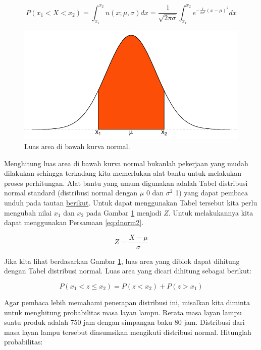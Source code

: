 \documentclass[]{book}
\begin{document}
\[
P\left(x_1<X<x_2\right)=\int_{x_1}^{x_2}n\left(x;\mu,\sigma\right)dx=\frac{1}{\sqrt{2\pi\sigma}}\int_{x_1}^{x_2}e^{-\frac{1}{2\sigma^2}\left(x-\mu\right)^2}dx
\]

\begin{figure}

{\centering \includegraphics[width=0.7\linewidth]{EnvStat_files/figure-latex/normvis4-1} 

}

\caption{Luas area di bawah kurva normal.}\label{fig:normvis4}
\end{figure}

Menghitung luas area di bawah kurva normal bukanlah pekerjaan yang mudah
dilakukan sehingga terkadang kita memerlukan alat bantu untuk melakukan
proses perhitungan. Alat bantu yang umum digunakan adalah Tabel
distribusi normal standard (distribusi normal dengan \(\mu\) 0 dan
\(\sigma^2\) 1) yang dapat pembaca unduh pada tautan
\href{https://onlinepubs.trb.org/onlinepubs/nchrp/cd-22/manual/v2appendixc.pdf}{berikut}.
Untuk dapat menggunakan Tabel tersebut kita perlu mengubah nilai \(x_1\)
dan \(x_2\) pada Gambar \ref{fig:normvis4} menjadi \(Z\). Untuk
melakukannya kita dapat menggunakan Persamaan \eqref{eq:dnorm2}.

\begin{equation}
   Z=\frac{X-\mu}{\sigma}
  \label{eq:dnorm2}
\end{equation}

Jika kita lihat berdasarkan Gambar \ref{fig:normvis4}, luas area yang
diblok dapat dihitung dengan Tabel distribusi normal. Luas area yang
dicari dihitung sebagai berikut:

\[
P\left(x_1<z\le x_2\right)=P\left(z< x_2\right)+P\left(z> x_1\right)
\]

Agar pembaca lebih memahami penerapan distribusi ini, misalkan kita
diminta untuk menghitung probabilitas masa layan lampu. Rerata masa
layan lampu suatu produk adalah 750 jam dengan simpangan baku 80 jam.
Distribusi dari masa layan lampu tersebut diasumsikan mengikuti
distribusi normal. Hitunglah probabilitas:
\end{document}
